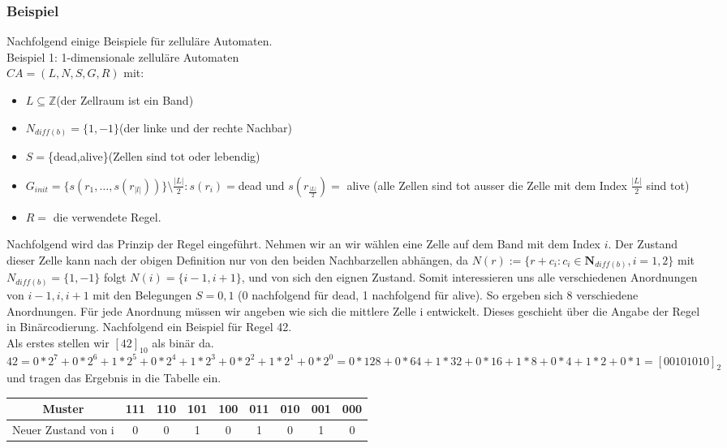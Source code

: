 \documentclass[11pt, fleqn, a4paper, leqno]{scrartcl} %
\begin{document}
	\subsubsection{Beispiel}
		Nachfolgend einige Beispiele für zelluläre Automaten.\\
		Beispiel 1: 1-dimensionale zelluläre Automaten\\
		$CA = (L,N,S,G,R)$ mit:
		\begin{itemize}
			\item $L \subseteq \mathds{Z}$(der Zellraum ist ein Band)
			\item $N_{diff(b)} = \{1,-1\}$(der linke und der rechte Nachbar)
			\item $S =$\{dead,alive\}(Zellen sind tot oder lebendig)
			\item  $G_{init} = \{s(r_{1},\dots,s(r_{ |l|}))\}\setminus \frac{|L|}{2}:s(r_{i})=$dead und $s(r_{\frac{|L|}{2}})=$ alive (alle Zellen sind tot ausser die Zelle mit dem Index $\frac{|L|}{2}$ sind tot)
			\item $R=$ die verwendete Regel.
		\end{itemize}
		Nachfolgend wird das Prinzip der Regel eingeführt. Nehmen wir an wir wählen eine Zelle auf dem Band mit dem Index $i$. Der Zustand dieser Zelle kann nach der obigen Definition nur von den beiden Nachbarzellen abhängen, da  $N(r) := \{r+c_{i}:c_{i} \in \mathbf{N}_{diff(b)}, i = 1,2\}$ mit $N_{diff(b)} = \{1,-1\}$ folgt $N(i)=\{i-1,i+1\}$, und von sich den eignen Zustand. Somit interessieren uns alle verschiedenen Anordnungen von $i-1,i,i+1$ mit den Belegungen $S={0,1}$ (0 nachfolgend für dead, 1 nachfolgend für alive). So ergeben sich 8 verschiedene Anordnungen. Für jede Anordnung müssen wir angeben wie sich die mittlere Zelle i entwickelt. Dieses geschieht über die Angabe der Regel in Binärcodierung. Nachfolgend ein Beispiel für Regel 42. \\
		Als erstes stellen wir $[42]_{10}$ als binär da. $42= 0*2^{7}+0*2^{6}+1*2^{5}+0*2^{4}+1*2^{3}+0*2^{2}+1*2^{1}+0*2^{0}=0*128+0*64+1*32+0*16+1*8+0*4+1*2+0*1=[00101010]_{2}$ und tragen das Ergebnis in die Tabelle ein.
		\begin{center}
			\begin{tabular}{|c|c|c|c|c|c|c|c|c|}
			\hline Muster & 111 & 110 & 101 & 100 & 011 & 010 & 001 & 000 \\ 
			\hline Neuer Zustand von i & 0 & 0 & 1 & 0 & 1 & 0 & 1 & 0    \\ 
			\hline 
			\end{tabular} 
		\end{center}
\end{document}
